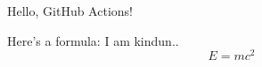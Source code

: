 \documentclass{article}
\begin{document}
Hello, GitHub Actions!

Here's a formula:
I am kindun..
\[
E = mc^2
\]
\end{document}
